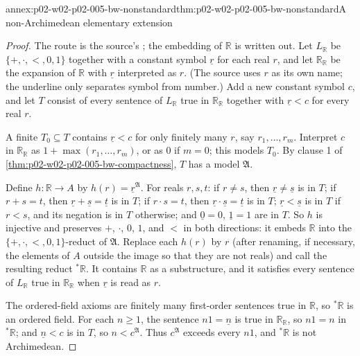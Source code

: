 \begin{annexitem}{annex:p02-w02-p02-005-bw-nonstandard}{thm:p02-w02-p02-005-bw-nonstandard}{A non-Archimedean elementary extension}
\begin{proof}
The route is the source's \cite[ch.~A.1, \S2, p.~12]{Barwise1977FirstOrder};
the embedding of \(\mathbb R\) is written out.  Let \(L_{\mathbb R}\) be
\(\{+,\cdot,<,0,1\}\) together with a constant symbol \(\underline r\) for
each real \(r\), and let \(\mathbb R_{\mathbb R}\) be the expansion of
\(\mathbb R\) with \(\underline r\) interpreted as \(r\).  (The source
uses \(r\) as its own name; the underline only separates symbol from
number.)  Add a new constant symbol \(c\), and let \(T\) consist of every
sentence of \(L_{\mathbb R}\) true in \(\mathbb R_{\mathbb R}\) together
with \(\underline r<c\) for every real \(r\).

A finite \(T_0\subseteq T\) contains \(\underline r<c\) for only finitely
many \(r\), say \(r_1,\ldots,r_m\).  Interpret \(c\) in
\(\mathbb R_{\mathbb R}\) as \(1+\max(r_1,\ldots,r_m)\), or as \(0\) if
\(m=0\); this models \(T_0\).  By clause 1 of
\cref{thm:p02-w02-p02-005-bw-compactness}, \(T\) has a model
\(\mathfrak A\).

Define \(h:\mathbb R\to A\) by \(h(r)=\underline r^{\mathfrak A}\).  For
reals \(r,s,t\): if \(r\neq s\), then \(\underline r\neq\underline s\) is
in \(T\); if \(r+s=t\), then \(\underline r+\underline s=\underline t\) is
in \(T\); if \(r\cdot s=t\), then \(\underline r\cdot\underline s=
\underline t\) is in \(T\); \(\underline r<\underline s\) is in \(T\) if
\(r<s\), and its negation is in \(T\) otherwise; and
\(\underline0=0\), \(\underline1=1\) are in \(T\).  So \(h\) is injective
and preserves \(+\), \(\cdot\), \(0\), \(1\), and \(<\) in both directions:
it embeds \(\mathbb R\) into the \(\{+,\cdot,<,0,1\}\)-reduct of
\(\mathfrak A\).  Replace each \(h(r)\) by \(r\) (after renaming, if
necessary, the elements of \(A\) outside the image so that they are not
reals) and call the resulting reduct \({}^*\mathbb R\).  It contains
\(\mathbb R\) as a substructure, and it satisfies every sentence of
\(L_{\mathbb R}\) true in \(\mathbb R_{\mathbb R}\) when \(\underline r\)
is read as \(r\).

The ordered-field axioms are finitely many first-order sentences true in
\(\mathbb R\), so \({}^*\mathbb R\) is an ordered field.  For each
\(n\geq1\), the sentence \(n1=\underline n\) is true in
\(\mathbb R_{\mathbb R}\), so \(n1=n\) in \({}^*\mathbb R\); and
\(\underline n<c\) is in \(T\), so \(n<c^{\mathfrak A}\).  Thus
\(c^{\mathfrak A}\) exceeds every \(n1\), and \({}^*\mathbb R\) is not
Archimedean.
\end{proof}
\end{annexitem}

